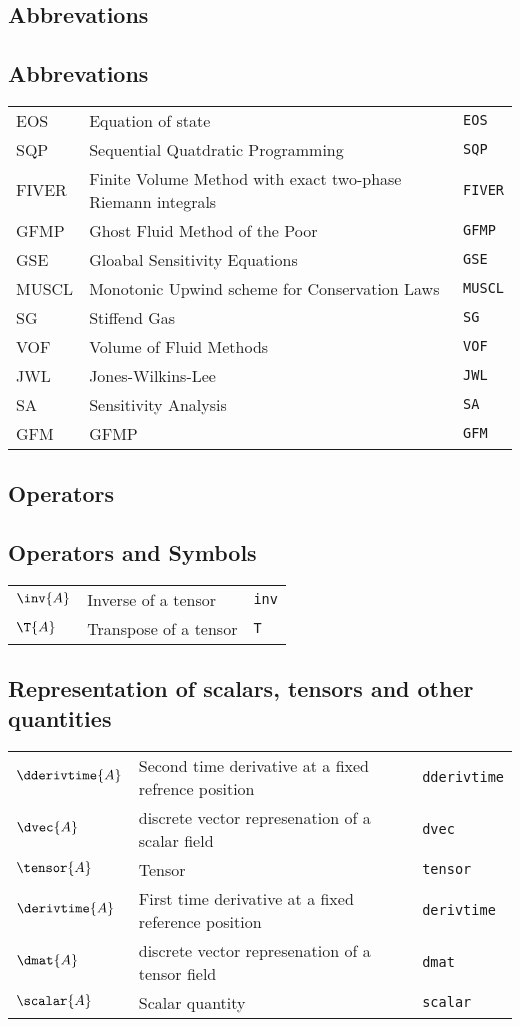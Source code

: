 \subsection*{Abbrevations}

\subsection*{Abbrevations}
\begin{tabular}{l l l}
EOS & Equation of state& \texttt{EOS}\\
SQP & Sequential Quatdratic Programming& \texttt{SQP}\\
FIVER & Finite Volume Method with exact two-phase Riemann integrals& \texttt{FIVER}\\
GFMP & Ghost Fluid Method of the Poor& \texttt{GFMP}\\
GSE & Gloabal Sensitivity Equations& \texttt{GSE}\\
MUSCL & Monotonic Upwind scheme for Conservation Laws& \texttt{MUSCL}\\
SG & Stiffend Gas& \texttt{SG}\\
VOF & Volume of Fluid Methods& \texttt{VOF}\\
JWL & Jones-Wilkins-Lee& \texttt{JWL}\\
SA & Sensitivity Analysis& \texttt{SA}\\
GFM & GFMP& \texttt{GFM}\\
\end{tabular}

\subsection*{Operators}

\subsection*{Operators and Symbols}
\begin{tabular}{l l l}
$\inv{A}$ & Inverse of a tensor& \texttt{inv}\\
$\T{A}$ & Transpose of a tensor& \texttt{T}\\
\end{tabular}

\subsection*{Representation of scalars, tensors and other quantities}
\begin{tabular}{l l l}
$\dderivtime{A}$ & Second time derivative at a fixed refrence position& \texttt{dderivtime}\\
$\dvec{A}$ & discrete vector represenation of a scalar field& \texttt{dvec}\\
$\tensor{A}$ & Tensor& \texttt{tensor}\\
$\derivtime{A}$ & First time derivative at a fixed reference position& \texttt{derivtime}\\
$\dmat{A}$ & discrete vector represenation of a tensor field& \texttt{dmat}\\
$\scalar{A}$ & Scalar quantity& \texttt{scalar}\\
\end{tabular}

